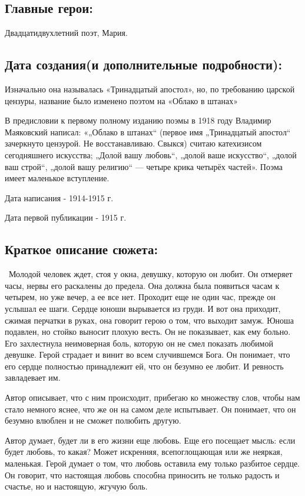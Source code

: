 \documentclass[a4paper,12pt]{article}
\begin{document}
	\subsection{Главные герои: }
	Двадцатидвухлетний поэт, Мария.
	\subsection{Дата создания(и дополнительные подробности): }
	
	Изначально она называлась «Тринадцатый апостол», но, по требованию царской цензуры, название было изменено поэтом на «Облако в штанах»
	
	\noindent
	В предисловии к первому полному изданию поэмы в 1918 году Владимир Маяковский написал: «„Облако в штанах“ (первое имя „Тринадцатый апостол“ зачеркнуто цензурой. Не восстанавливаю. Свыкся) считаю катехизисом сегодняшнего искусства; „Долой вашу любовь“, „долой ваше искусство“, „долой ваш строй“, „долой вашу религию“ — четыре крика четырёх частей». Поэма имеет маленькое вступление. 
	
	\noindent
	Дата написания - 1914-1915 г.
	
	\noindent
	Дата первой публикации - 1915 г.
	
	\subsection{Краткое описание сюжета: }
	\quad \, Молодой человек ждет, стоя у окна, девушку, которую он любит. Он отмеряет часы, нервы его раскалены до предела. Она должна была появиться часам к четырем, но уже вечер, а ее все нет. Проходит еще не один час, прежде он услышал ее шаги. Сердце юноши вырывается из груди. И вот она приходит, сжимая перчатки в руках, она говорит герою о том, что выходит замуж. Юноша подавлен, но стойко выносит плохую весть. Он не показывает, как ему больно. Его захлестнула неимоверная боль, которую он не смел показать любимой девушке. Герой страдает и винит во всем случившемся Бога. Он понимает, что его сердце полностью принадлежит ей, что он безумно ее любит. И ревность завладевает им.
	
	Автор описывает, что с ним происходит, прибегаю ко множеству слов, чтобы нам стало немного яснее, что же он на самом деле испытывает. Он понимает, что он безумно влюблен и не сможет полюбить другую.
	
	Автор думает, будет ли в его жизни еще любовь. Еще его посещает мысль: если будет любовь, то какая? Может искренняя, всепоглощающая или же неяркая, маленькая. Герой думает о том, что любовь оставила ему только разбитое сердце. Он говорит, что настоящая любовь способна приносить не только радость и счастье, но и настоящую, жгучую боль.
	
\end{document}
